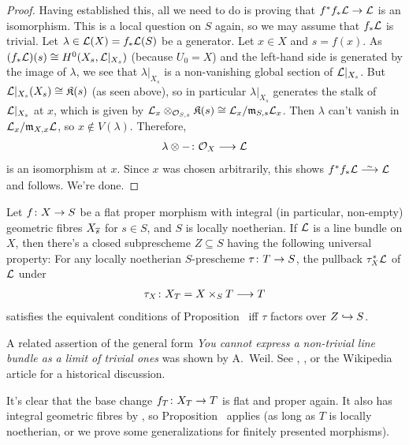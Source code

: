 \documentclass[a4paper,parskip=half,numbers=enddot, DIV=12]{scrreprt}
\begin{document}
\begin{proof}
	Having established this, all we need to do is proving that $f^*f_*\Ll\morphism\Ll$ is an isomorphism. This is a local question on $S$ again, so we may assume that $f_*\mathcal{L}$ is trivial. Let $\lambda\in\mathcal{L}(X)=f_*\mathcal{L}(S)$ 
	be a generator. Let $x\in X$ and $s=f(x)$. As $(f_*\mathcal{L})(s)\cong H^0(X_s,\mathcal{L}|_{X_s})$ (because $U_0=X$) and the left-hand side is generated by the image of $\lambda$, we see that $\lambda|_{X_s}$ is a non-vanishing global section of $\mathcal{L}|_{X_s}$. But $\mathcal{L}|_{X_s}(X_s)\cong \mathfrak{K}(s)$ (as seen above), so in particular $\lambda|_{X_s}$ generates the stalk of $\mathcal{L}|_{X_s}$ at $x$, which is given by $\mathcal{L}_x\otimes_{\mathcal{O}_{S,s}}\mathfrak{K}(s)\cong \mathcal{L}_x/\mathfrak{m}_{S,s}\mathcal{L}_x$. Then $\lambda$ can't vanish in $\mathcal{L}_x/\mathfrak{m}_{X,x}\mathcal{L}$, so $x\notin V(\lambda)$. Therefore,
	\begin{align*}
		\lambda\otimes-\colon \Oo_X\morphism\Ll
	\end{align*}
	is an isomorphism at $x$. Since $x$ was chosen arbitrarily, this shows $f^*f_*\Ll\isomorphism\Ll$ and  follows. We're done.
\end{proof}
\begin{thm}
	Let $f\colon X\morphism S$ be a flat proper morphism with integral (in particular, non-empty) geometric fibres $X_{\overline{s}}$ for $s\in S$, and $S$ is locally noetherian. If $\mathcal{L}$ is a line bundle on $X$, then there's a closed subprescheme $Z\subseteq S$ having the following universal property: For any locally noetherian $S$-prescheme $\tau\colon T\morphism S$, the pullback $\tau_X^*\mathcal{L}$ of $\mathcal{L}$ under
	\begin{align*}
		\tau_X\colon X_T=X\times_ST\morphism T
	\end{align*}
	satisfies the equivalent conditions of Proposition~ iff $\tau$ factors over $Z\monomorphism S$.
\end{thm}
\begin{rem}
	\begin{alphanumerate}
		\item A related assertion of the general form \emph{You cannot express a non-trivial line bundle as a limit of trivial ones} was shown by A.\ Weil. See \cite{cornell1986arithmetic}, \cite{mumford1974abelian}, or the Wikipedia article for a historical discussion.
		\item It's clear that the base change $f_T\colon X_T\morphism T$ is flat and proper again. It also has integral geometric fibres by \cite[ and ]{stacks-project}, so Proposition~ applies (as long as $T$ is locally noetherian, or we prove some generalizations for finitely presented morphisms).
	\end{alphanumerate}
\end{rem}
\end{document}
